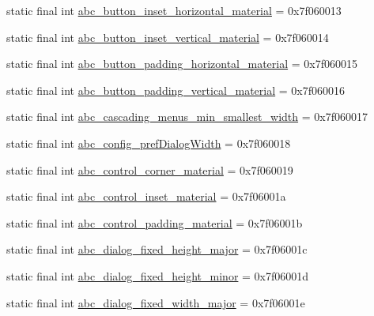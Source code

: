 \begin{DoxyCompactItemize}
\item 
static final int \mbox{\hyperlink{classandroid_1_1support_1_1design_1_1_r_1_1dimen_aa874e9a2211b7eaf3a6c6b45423ee3d5}{abc\+\_\+button\+\_\+inset\+\_\+horizontal\+\_\+material}} = 0x7f060013
\item 
static final int \mbox{\hyperlink{classandroid_1_1support_1_1design_1_1_r_1_1dimen_a4f55256e84d9d47f13cf1553adbbb153}{abc\+\_\+button\+\_\+inset\+\_\+vertical\+\_\+material}} = 0x7f060014
\item 
static final int \mbox{\hyperlink{classandroid_1_1support_1_1design_1_1_r_1_1dimen_adf85bcb0e234cbc7883e6d6e6dc005e3}{abc\+\_\+button\+\_\+padding\+\_\+horizontal\+\_\+material}} = 0x7f060015
\item 
static final int \mbox{\hyperlink{classandroid_1_1support_1_1design_1_1_r_1_1dimen_a15726a35ff8b417641bbc00e360df277}{abc\+\_\+button\+\_\+padding\+\_\+vertical\+\_\+material}} = 0x7f060016
\item 
static final int \mbox{\hyperlink{classandroid_1_1support_1_1design_1_1_r_1_1dimen_a407a24f2b9ce7bda68c742ab29c3860a}{abc\+\_\+cascading\+\_\+menus\+\_\+min\+\_\+smallest\+\_\+width}} = 0x7f060017
\item 
static final int \mbox{\hyperlink{classandroid_1_1support_1_1design_1_1_r_1_1dimen_ada9bce90209861ef96ac780cc525730c}{abc\+\_\+config\+\_\+pref\+Dialog\+Width}} = 0x7f060018
\item 
static final int \mbox{\hyperlink{classandroid_1_1support_1_1design_1_1_r_1_1dimen_a309e3353e64253f83debdb45d1449e74}{abc\+\_\+control\+\_\+corner\+\_\+material}} = 0x7f060019
\item 
static final int \mbox{\hyperlink{classandroid_1_1support_1_1design_1_1_r_1_1dimen_a2be8e6d98d31e9f2a87de1071f804927}{abc\+\_\+control\+\_\+inset\+\_\+material}} = 0x7f06001a
\item 
static final int \mbox{\hyperlink{classandroid_1_1support_1_1design_1_1_r_1_1dimen_a8019524092bba937679a2feb43ed2dc0}{abc\+\_\+control\+\_\+padding\+\_\+material}} = 0x7f06001b
\item 
static final int \mbox{\hyperlink{classandroid_1_1support_1_1design_1_1_r_1_1dimen_a02a2b42830c5c23e9403db9cf45abe99}{abc\+\_\+dialog\+\_\+fixed\+\_\+height\+\_\+major}} = 0x7f06001c
\item 
static final int \mbox{\hyperlink{classandroid_1_1support_1_1design_1_1_r_1_1dimen_af720ae1061dfd45d7cd27ee4f430d417}{abc\+\_\+dialog\+\_\+fixed\+\_\+height\+\_\+minor}} = 0x7f06001d
\item 
static final int \mbox{\hyperlink{classandroid_1_1support_1_1design_1_1_r_1_1dimen_a22df7a3a126ea5e7182c89eea23a604f}{abc\+\_\+dialog\+\_\+fixed\+\_\+width\+\_\+major}} = 0x7f06001e

\end{DoxyCompactItemize}
